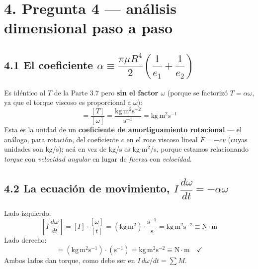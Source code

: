 \documentclass[11pt]{article}
\begin{document}
\section*{4. Pregunta 4 --- an\'alisis dimensional paso a paso}

\subsection*{4.1 El coeficiente $\alpha\equiv\dfrac{\pi\mu R^4}{2}\!\left(\dfrac1{e_1}+
\dfrac1{e_2}\right)$}
Es id\'entico al $T$ de la Parte 3.7 pero \textbf{sin el factor $\omega$} (porque se
factoriz\'o $T=\alpha\omega$, ya que el torque viscoso es proporcional a $\omega$):
\begin{equation}
[\alpha] = \frac{[T]}{[\omega]}
= \frac{\text{kg}\,\text{m}^2\text{s}^{-2}}{\text{s}^{-1}}
= \text{kg}\,\text{m}^2\text{s}^{-1}
\end{equation}
Esta es la unidad de un \textbf{coeficiente de amortiguamiento rotacional} --- el
an\'alogo, para rotaci\'on, del coeficiente $c$ en el roce viscoso lineal $F=-cv$
(cuyas unidades son kg/s); ac\'a en vez de kg/s es kg$\cdot$m$^2$/s, porque estamos
relacionando \emph{torque} con \emph{velocidad angular} en lugar de \emph{fuerza} con
\emph{velocidad}.

\subsection*{4.2 La ecuaci\'on de movimiento, $I\,\dfrac{d\omega}{dt}=-\alpha\omega$}
Lado izquierdo:
\begin{equation}
\left[I\,\frac{d\omega}{dt}\right] = [I]\cdot\frac{[\omega]}{[t]}
= \left(\text{kg}\,\text{m}^2\right)\cdot\frac{\text{s}^{-1}}{\text{s}}
= \text{kg}\,\text{m}^2\text{s}^{-2} \equiv \text{N}\cdot\text{m}
\end{equation}
Lado derecho:
\begin{equation}
[\alpha\omega] = \left(\text{kg}\,\text{m}^2\text{s}^{-1}\right)\cdot\left(\text{s}^{-1}
\right) = \text{kg}\,\text{m}^2\text{s}^{-2} \equiv \text{N}\cdot\text{m}\quad\checkmark
\end{equation}
Ambos lados dan torque, como debe ser en $I\,d\omega/dt=\sum M$.
\end{document}
